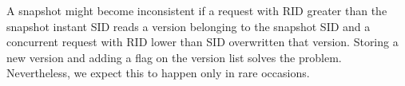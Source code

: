 A snapshot might become inconsistent if a request with \ac{RID} greater than the snapshot instant \ac{SID} reads a version belonging to the snapshot \ac{SID} and a concurrent request with \ac{RID} lower than \ac{SID} overwritten that version. Storing a new version and adding a flag on the version list solves the problem. Nevertheless, we expect this to happen only in rare occasions.




